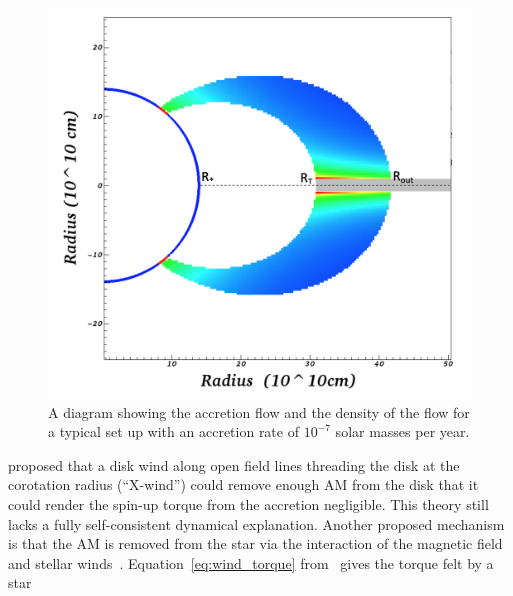 \documentclass[fleqn,usenatbib]{mnras}
\begin{document}
\begin{figure}
    \centering
    \includegraphics[width=\linewidth]{figures/Accretion}
    \caption{A diagram showing the accretion flow and the density of the flow for a typical set up with an accretion rate of $10^{-7}$ solar masses per year.}
    \label{fig:accretionflow}
\end{figure}

\citet{Shu:tw} proposed that a disk wind along open field lines threading the disk at the corotation radius (``X-wind'') could remove enough AM from the disk that it could render the spin-up torque from the accretion negligible. This theory still lacks a fully self-consistent dynamical explanation. Another proposed mechanism is that the AM is removed from the star via the interaction of the magnetic field and stellar winds~\citep[e.g.][]{2005ApJ...632L.135M,Matt:2008bj}. Equation~\ref{eq:wind_torque} from~\citep{2005ApJ...632L.135M} gives the torque felt by a star
\end{document}
